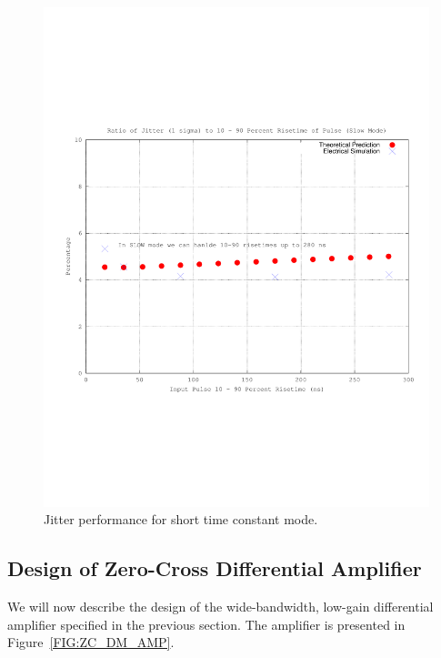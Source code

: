 \documentclass[12pt, onecolumn]{IEEEtran}
\begin{document}
\begin{figure}[htbp!]
	\centering
 	\includegraphics[scale=0.7,keepaspectratio=true]{./images/jitter_slow_mode.pdf}
 	\caption{Jitter performance for short time constant mode.}
 	\label{FIG:JITTER_SLOW}
\end{figure}


\subsection*{Design of Zero-Cross Differential Amplifier}


We will now describe the design of the wide-bandwidth, low-gain differential amplifier specified in the previous section. The amplifier is presented in Figure~\ref{FIG:ZC_DM_AMP}. \\
\end{document}

